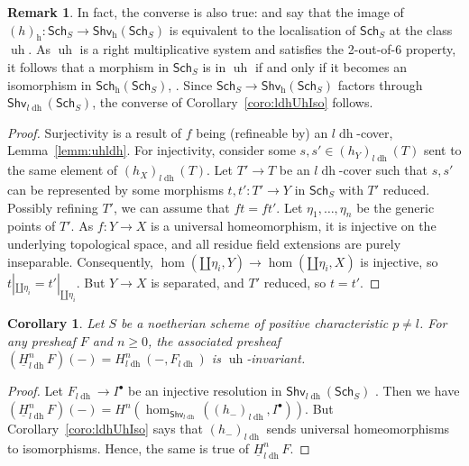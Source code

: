 \documentclass[10pt]{amsart}
\newtheorem{coro}[theo]{Corollary}
\theoremstyle{definition}
\newtheorem{rema}[theo]{Remark}
\newcommand{\Shv}{\mathsf{Shv}}
\newcommand{\Sch}{\mathsf{Sch}}
\newcommand{\ulh}{\underline{H}}
\newcommand{\h}{{{\operatorname{h}}}}
\newcommand{\ldh}{{l{\operatorname{dh}}}}
\newcommand{\uh}{\operatorname{uh}}
\begin{document}
\begin{rema} \label{rema:ldhUhIso}
In fact, the converse is also true: \cite[Thm.3.2.9]{Voe96} and \cite[Thm.8.16]{Ryd10} say that the image of $(h)_\h: \Sch_S \to \Shv_\h(\Sch_S)$ is equivalent to the localisation of $\Sch_S$ at the class $\uh$. As $\uh$ is a right multiplicative system and satisfies the 2-out-of-6 property, it follows that a morphism in $\Sch_S$ is in $\uh$ if and only if it becomes an isomorphism in $\Sch_\h(\Sch_S)$, \cite[7.1.20]{KS06}.  Since $\Sch_S \to \Shv_\h(\Sch_S)$ factors through $\Shv_\ldh(\Sch_S)$, the converse of Corollary~\ref{coro:ldhUhIso} follows.
\end{rema}

\begin{proof}
Surjectivity is a result of $f$ being (refineable by) an $\ldh$-cover, Lemma~\ref{lemm:uhldh}. For injectivity, consider some $s, s' \in (h_Y)_\ldh(T)$ sent to the same element of $(h_X)_\ldh(T)$. Let $T' \to T$ be an $\ldh$-cover such that $s, s'$ can be represented by some morphisms $t, t': T' \to Y$ in $\Sch_S$ with $T'$ reduced. Possibly refining $T'$, we can assume that $ft = ft'$. Let $\eta_1, \dots, \eta_n$ be the generic points of $T'$. As $f: Y \to X$ is a universal homeomorphism, it is injective on the underlying topological space, and all residue field extensions are purely inseparable. Consequently, $\hom(\amalg \eta_i, Y) \to \hom(\amalg \eta_i, X)$ is injective, so $t|_{\amalg \eta_i} = t'|_{\amalg \eta_i}$. But $Y \to X$ is separated, and $T'$ reduced, so %
$t = t'$.
\end{proof}

\begin{coro} \label{coro:Huhinv}
Let $S$ be a noetherian scheme of positive characteristic $p \neq l$. For any presheaf $F$ and $n \geq 0$, the associated presheaf $(\ulh^n_\ldh F)(-) = H_\ldh^n(-, F_\ldh)$ is $\uh$-invariant.
\end{coro}

\begin{proof}
Let $F_\ldh \to I^\bullet$ be an injective resolution in $\Shv_\ldh(\Sch_S)$%
. %
Then we have $(\ulh^n_\ldh F)(-) = H^n(\hom_{\Shv_\ldh}((h_-)_\ldh, I^\bullet))$. But Corollary~\ref{coro:ldhUhIso} says that $(h_-)_\ldh$ sends universal homeomorphisms to isomorphisms. Hence, the same is true of $\ulh^n_\ldh F$.
\end{proof}
\end{document}
